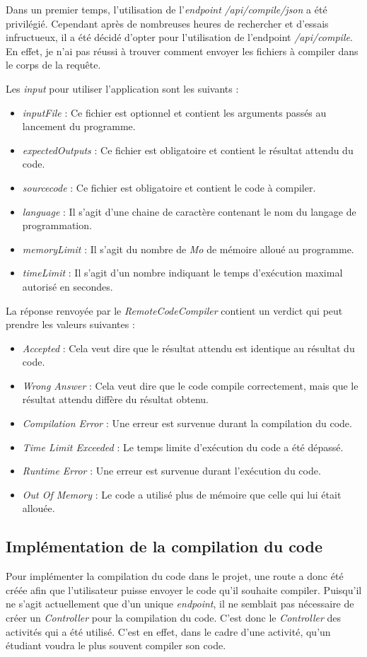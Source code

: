 Dans un premier temps, l'utilisation de l'\emph{endpoint} \emph{/api/compile/json} a été privilégié. Cependant après de nombreuses heures de rechercher et d'essais infructueux, il a été décidé d'opter pour l'utilisation de l'endpoint \emph{/api/compile}. En effet, je n'ai pas réussi à trouver comment envoyer les fichiers à compiler dans le corps de la requête.

Les \emph{input} pour utiliser l'application sont les suivants :
\begin{itemize}
    \item \emph{inputFile} : Ce fichier est optionnel et contient les arguments passés au lancement du programme.
    \item \emph{expectedOutputs} : Ce fichier est obligatoire et contient le résultat attendu du code.
    \item \emph{sourcecode} : Ce fichier est obligatoire et contient le code à compiler.
    \item \emph{language} : Il s'agit d'une chaine de caractère contenant le nom du langage de programmation.
    \item \emph{memoryLimit} : Il s'agit du nombre de \emph{Mo} de mémoire alloué au programme.
    \item \emph{timeLimit} : Il s'agit d'un nombre indiquant le temps d'exécution maximal autorisé en secondes.
\end{itemize}

La réponse renvoyée par le \emph{RemoteCodeCompiler} contient un verdict qui peut prendre les valeurs suivantes :
\begin{itemize}
    \item \emph{Accepted} : Cela veut dire que le résultat attendu est identique au résultat du code.
    \item \emph{Wrong Answer} : Cela veut dire que le code compile correctement, mais que le résultat attendu diffère du résultat obtenu.
    \item \emph{Compilation Error} : Une erreur est survenue durant la compilation du code.
    \item \emph{Time Limit Exceeded} : Le temps limite d'exécution du code a été dépassé.
    \item \emph{Runtime Error} : Une erreur est survenue durant l'exécution du code.
    \item \emph{Out Of Memory} : Le code a utilisé plus de mémoire que celle qui lui était allouée.
\end{itemize}

\subsection{Implémentation de la compilation du code}
Pour implémenter la compilation du code dans le projet, une route a donc été créée afin que l'utilisateur puisse envoyer le code qu'il souhaite compiler. Puisqu'il ne s'agit actuellement que d'un unique \emph{endpoint}, il ne semblait pas nécessaire de créer un \emph{Controller} pour la compilation du code. C'est donc le \emph{Controller} des activités qui a été utilisé. C'est en effet, dans le cadre d'une activité, qu'un étudiant voudra le plus souvent compiler son code.

